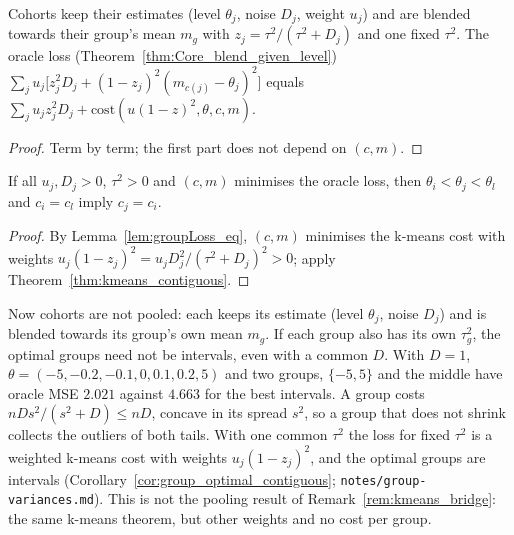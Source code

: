 \begin{lemma}\label{lem:groupLoss_eq}
  \leanok
  Cohorts keep their estimates (level $\theta_j$, noise $D_j$, weight $u_j$) and are blended
  towards their group's mean $m_g$ with $z_j = \tau^2/(\tau^2 + D_j)$ and one fixed $\tau^2$. The
  oracle loss (Theorem~\ref{thm:Core_blend_given_level})
  $\sum_j u_j\bigl[z_j^2D_j + (1-z_j)^2(m_{c(j)} - \theta_j)^2\bigr]$ equals
  $\sum_j u_jz_j^2D_j + \mathrm{cost}(u(1-z)^2, \theta, c, m)$.
\end{lemma}
\begin{proof}
  \leanok
  Term by term; the first part does not depend on $(c, m)$.
\end{proof}

\begin{corollary}\label{cor:group_optimal_contiguous}
  \leanok
  If all $u_j, D_j > 0$, $\tau^2 > 0$ and $(c, m)$ minimises the oracle loss, then
  $\theta_i < \theta_j < \theta_l$ and $c_i = c_l$ imply $c_j = c_i$.
\end{corollary}
\begin{proof}
  \leanok
  By Lemma~\ref{lem:groupLoss_eq}, $(c, m)$ minimises the k-means cost with weights
  $u_j(1-z_j)^2 = u_jD_j^2/(\tau^2 + D_j)^2 > 0$; apply Theorem~\ref{thm:kmeans_contiguous}.
\end{proof}

\begin{remark}\label{rem:group_variances}
  Now cohorts are not pooled: each keeps its estimate (level $\theta_j$, noise $D_j$) and is blended
  towards its group's own mean $m_g$. If each group also has its own $\tau_g^2$, the optimal groups
  need not be intervals, even with a common $D$. With $D = 1$,
  $\theta = (-5, -0.2, -0.1, 0, 0.1, 0.2, 5)$ and two groups, $\{-5, 5\}$ and the middle have
  oracle MSE $2.021$ against $4.663$ for the best intervals. A group costs
  $n D s^2/(s^2 + D) \le nD$, concave in its spread $s^2$, so a group that does not shrink collects the
  outliers of both tails. With one common $\tau^2$ the loss for fixed $\tau^2$ is a weighted k-means
  cost with weights $u_j(1 - z_j)^2$, and the optimal groups are intervals
  (Corollary~\ref{cor:group_optimal_contiguous}; \texttt{notes/group-variances.md}). This is not
  the pooling result of Remark~\ref{rem:kmeans_bridge}: the same k-means theorem, but other weights
  and no cost per group.
\end{remark}

